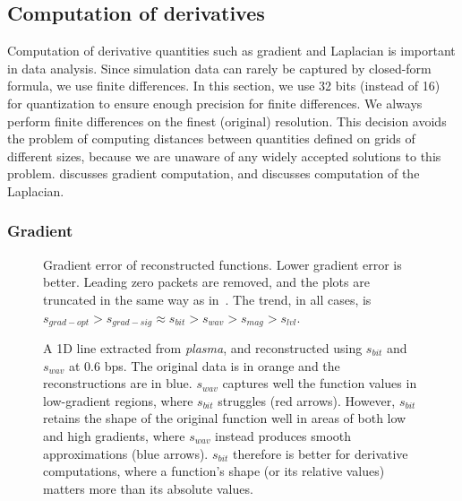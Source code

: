 \subsection{Computation of derivatives}\label{sec:derivatives}
Computation of derivative quantities such as gradient and Laplacian is important in
data analysis. Since simulation data can rarely be captured by closed-form formula, we use finite
differences. In this section, we use 32 bits (instead of 16) for quantization to ensure enough
precision for finite differences. We always perform finite differences on the finest (original)
resolution. This decision avoids the problem of computing distances between quantities defined on
grids of different sizes, because we are unaware of any widely accepted solutions to this problem.
 discusses gradient computation, and  discusses
computation of the Laplacian.

\subsubsection{Gradient}\label{sec:gradient}

\begin{figure}[h]
	\centering
	 \caption{Gradient
	error of reconstructed functions. Lower gradient error is better. Leading zero packets are removed, and the plots
	are truncated in the same way as in~. The trend, in all cases, is
	$s_{grad-opt} > s_{grad-sig} \approx s_{bit} > s_{wav} > s_{mag} > s_{lvl}$.}
	\label{fig:gradient-error-comparison}
\end{figure}

\begin{figure}[h]
	\centering
	\caption{A 1D line extracted from \emph{plasma}, and reconstructed using $s_{bit}$ and $s_{wav}$ at
	0.6 bps. The original data is in orange and the reconstructions are in blue. $s_{wav}$ captures
	well the function values in low-gradient regions, where $s_{bit}$ struggles (red arrows).
	However, $s_{bit}$ retains the shape of the original function well in areas of both low and high
	gradients, where $s_{wav}$ instead produces smooth approximations (blue arrows). $s_{bit}$
	therefore is better for	derivative computations, where a function's shape (or its relative
	values) matters more than its absolute values.}\label{fig:bit-plane-vs-wavelet-norm-gradient}
\end{figure}

